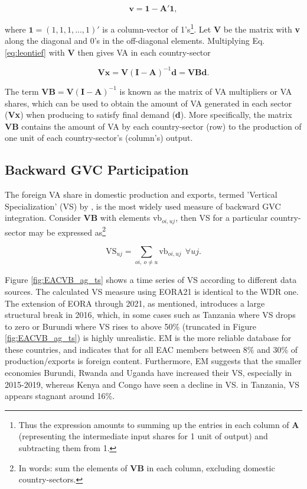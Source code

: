 \documentclass[a4paper]{article}
\begin{document}
\begin{equation}
\textbf{v} = \textbf{1} - \textbf{A}'\textbf{1},
\end{equation}

where $\textbf{1} = (1, 1, 1, ..., 1)'$ is a column-vector of 1's\footnote{Thus the expression amounts to summing up the entries in each column of \textbf{A} (representing the intermediate input shares for 1 unit of output) and subtracting them from 1.}. Let \textbf{V} be the matrix with \textbf{v} along the diagonal and 0's in the off-diagonal elements. Multiplying Eq. \ref{eq:leontief} with $\textbf{V}$ then gives VA in each country-sector

\begin{equation} \label{eq:VB}
\textbf{V}\textbf{x} = \textbf{V}(\textbf{I}-\textbf{A})^{-1} \textbf{d} = \textbf{VBd}.
\end{equation}

The term $\textbf{VB} = \textbf{V}(\textbf{I}-\textbf{A})^{-1}$ is known as the matrix of VA multipliers or VA shares, which can be used to obtain the amount of VA generated in each sector (\textbf{Vx}) when producing to satisfy final demand (\textbf{d}). More specifically, the matrix $\textbf{VB}$ contains the amount of VA by each country-sector (row) to the production of one unit of each country-sector's (column's) output. 


\subsection{Backward GVC Participation}

The foreign VA share in domestic production and exports, termed 'Vertical Specialization' (VS) by \citet{hummels2001nature}, is the most widely used measure of backward GVC integration. Consider \textbf{VB} with elements vb$_{oi,uj}$, then VS for a particular country-sector may be expressed as\footnote{In words: sum the elements of \textbf{VB} in each column, excluding domestic country-sectors.}

\begin{equation} \label{eq:VS}
\text{VS}_{uj} = \sum_{oi,\ o \neq  u} \text{vb}_{oi, uj}\ \ \forall uj.
\end{equation}

Figure \ref{fig:EACVB_ag_ts} shows a time series of VS according to different data sources. The calculated VS measure using EORA21 is identical to the WDR one. The extension of EORA through 2021, as mentioned, introduces a large structural break in 2016, which, in some cases such as Tanzania where VS drops to zero or Burundi where VS rises to above 50\% (truncated in Figure \ref{fig:EACVB_ag_ts}) is highly unrealistic. EM is the more reliable database for these countries, and indicates that for all EAC members between 8\% and 30\% of production/exports is foreign content. Furthermore, EM suggests that the smaller economies Burundi, Rwanda and Uganda have increased their VS, especially in 2015-2019, whereas Kenya and Congo have seen a decline in VS. in Tanzania, VS appears stagnant around 16\%. 
\end{document}

